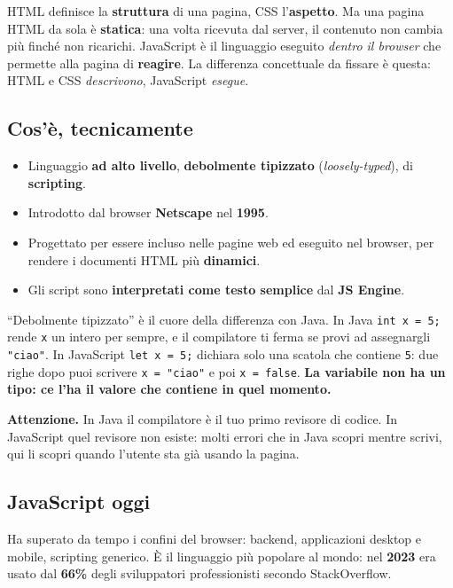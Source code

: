 \documentclass[10pt,a4paper]{article}
\newcommand{\avviso}[1]{\textbf{\textcolor{wamber}{Attenzione.}} #1}
\begin{document}
HTML definisce la \textbf{struttura} di una pagina, CSS l'\textbf{aspetto}. Ma una pagina HTML da sola è \textbf{statica}: una volta ricevuta dal server, il contenuto non cambia più finché non ricarichi. JavaScript è il linguaggio eseguito \emph{dentro il browser} che permette alla pagina di \textbf{reagire}. La differenza concettuale da fissare è questa: HTML e CSS \emph{descrivono}, JavaScript \emph{esegue}.

\subsection*{Cos'è, tecnicamente}

\begin{itemize}
  \item Linguaggio \textbf{ad alto livello}, \textbf{debolmente tipizzato} (\emph{loosely-typed}), di \textbf{scripting}.
  \item Introdotto dal browser \textbf{Netscape} nel \textbf{1995}.
  \item Progettato per essere incluso nelle pagine web ed eseguito nel browser, per rendere i documenti HTML più \textbf{dinamici}.
  \item Gli script sono \textbf{interpretati come testo semplice} dal \textbf{JS Engine}.
\end{itemize}

``Debolmente tipizzato'' è il cuore della differenza con Java. In Java \texttt{int x = 5;} rende \texttt{x} un intero per sempre, e il compilatore ti ferma se provi ad assegnargli \texttt{"ciao"}. In JavaScript \texttt{let x = 5;} dichiara solo una scatola che contiene \texttt{5}: due righe dopo puoi scrivere \texttt{x = "ciao"} e poi \texttt{x = false}. \textbf{La variabile non ha un tipo: ce l'ha il valore che contiene in quel momento.}

\begin{warnbox}
\avviso{In Java il compilatore è il tuo primo revisore di codice. In JavaScript quel revisore non esiste: molti errori che in Java scopri mentre scrivi, qui li scopri quando l'utente sta già usando la pagina.}
\end{warnbox}

\subsection*{JavaScript oggi}

Ha superato da tempo i confini del browser: backend, applicazioni desktop e mobile, scripting generico. È il linguaggio più popolare al mondo: nel \textbf{2023} era usato dal \textbf{66\%} degli sviluppatori professionisti secondo StackOverflow.
\end{document}
